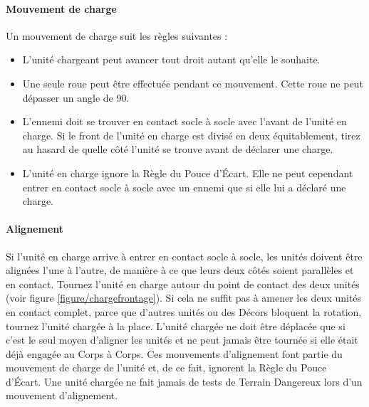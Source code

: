 \paragraph{Mouvement de charge}

Un mouvement de charge suit les règles suivantes :
\begin{itemize}[label={-}]
\item L'unité chargeant peut avancer tout droit autant qu'elle le souhaite.
\item Une seule roue peut être effectuée pendant ce mouvement. Cette roue ne peut dépasser un angle de 90{\text{\degree}}.
\item L'ennemi doit se trouver en contact socle à socle avec l'avant de l'unité en charge. Si le front de l'unité en charge est divisé en deux équitablement, tirez au hasard de quelle côté l'unité se trouve avant de déclarer une charge.
\item L'unité en charge ignore la Règle du Pouce d'Écart. Elle ne peut cependant entrer en contact socle à socle avec un ennemi que si elle lui a déclaré une charge.
\end{itemize}

\paragraph{Alignement}
\label{aligning_units}

Si l'unité en charge arrive à entrer en contact socle à socle, les unités doivent être alignées l'une à l'autre, de manière à ce que leurs deux côtés soient parallèles et en contact. Tournez l'unité en charge autour du point de contact des deux unités (voir figure \ref{figure/chargefrontage}). Si cela ne suffit pas à amener les deux unités en contact complet, parce que d'autres unités ou des Décors bloquent la rotation, tournez l'unité chargée à la place. L'unité chargée ne doit être déplacée que si c'est le seul moyen d'aligner les unités et ne peut jamais être tournée si elle était déjà engagée au Corps à Corps. Ces mouvements d'alignement font partie du mouvement de charge de l'unité et, de ce fait, ignorent la Règle du Pouce d'Écart. Une unité chargée ne fait jamais de tests de Terrain Dangereux lors d'un mouvement d'alignement.

